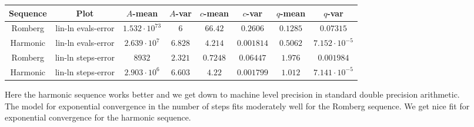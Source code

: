 \begin{table}[H]
    \centering\small
     \begin{tabular}{c|c||c|c|c|c|c|c}
Sequence & Plot & \(A\)-mean & \(A\)-var & \(c\)-mean & \(c\)-var & \(q\)-mean & \(q\)-var\\\hline
\rowcolor{red}
Romberg & lin-ln evals-error & \(1.532\cdot 10^{73}\) & \(6\) & \(66.42\) & \(0.2606\) & \(0.1285\) & \(0.07315\) \\
\rowcolor{green}
Harmonic & lin-ln evals-error & \(2.639\cdot 10^7\) & \(6.828\) & \(4.214\) & \(0.001814\) & \(0.5062\) & \(7.152\cdot 10^{-5}\) \\
\rowcolor{green}
Romberg & lin-ln steps-error & \(8932\) & \(2.321\) & \(0.7248\) & \(0.06447\) & \(1.976\) & \(0.001984\) \\
\rowcolor{green}
Harmonic & lin-ln steps-error & \(2.903\cdot 10^6\) & \(6.603\) & \(4.22\) & \(0.001799\) & \(1.012\) & \(7.141\cdot 10^{-5}\) \\
    \end{tabular}
    \label{tab:my_label}
\end{table}

Here the harmonic sequence works better and we get down to machine level precision in standard double precision arithmetic.\\

The model for exponential convergence in the number of steps fits moderately well for the Romberg sequence. We get nice fit for exponential convergence for the harmonic sequence.


